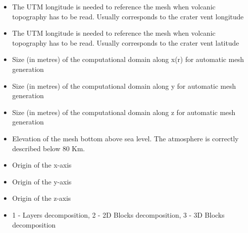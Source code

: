 \begin{itemize}
\item
{}
{The UTM longitude is needed to reference the mesh when volcanic topography has to be read. Usually corresponds to the crater vent longitude}

\item
{}
{The UTM longitude is needed to reference the mesh when volcanic topography has to be read. Usually corresponds to the crater vent latitude}

\item
{}
{Size (in metres) of the computational domain along x(r) for automatic mesh generation}

\item
{}
{Size (in metres) of the computational domain along y for automatic mesh generation}

\item
{}
{Size (in metres) of the computational domain along z for automatic mesh generation}

\item
{}
{Elevation of the mesh bottom above sea level. The atmosphere is correctly
described below 80 Km.}

\item
{}
{Origin of the x-axis}

\item
{}
{Origin of the y-axis}

\item
{}
{Origin of the z-axis}

\item
{}
{1 - Layers decomposition, 2 - 2D Blocks decomposition, 3 - 3D Blocks decomposition}

\end{itemize}


